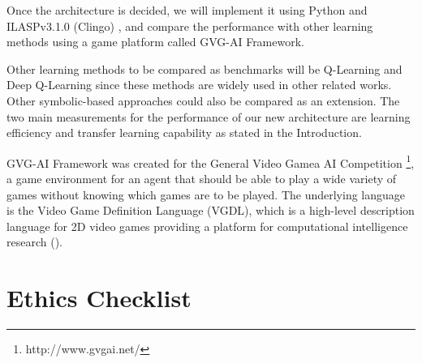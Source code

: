 \documentclass[12pt,twoside]{report}
\begin{document}
Once the architecture is decided, we will implement it using Python and ILASPv3.1.0 (Clingo) \cite{Law2017}, and compare the performance with other learning methods using a game platform called GVG-AI Framework.

Other learning methods to be compared as benchmarks will be Q-Learning and Deep Q-Learning since these methods are widely used in other related works. Other symbolic-based approaches could also be compared as an extension. The two main measurements for the performance of our new architecture are learning efficiency and transfer learning capability as stated in the Introduction.

GVG-AI Framework was created for the General Video Gamea AI Competition \footnote{http://www.gvgai.net/}, a game environment for an agent that should be able to play a wide variety of games without knowing which games are to be played.
The underlying language is the Video Game Definition Language (VGDL), which is a high-level description language for 2D video games providing a platform for computational intelligence research (\cite{Schaul2013}).

%
%


\chapter{Ethics Checklist}
\label{ethics_checklist}
\end{document}
